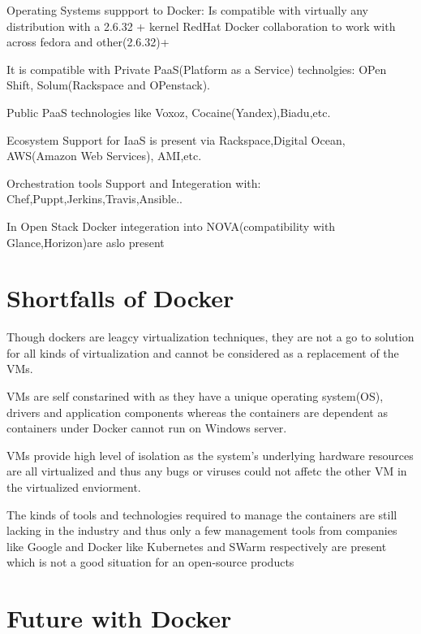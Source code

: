 \documentclass[9pt,twocolumn,twoside]{styles/osajnl}
\begin{document}
Operating Systems suppport to Docker: Is compatible with virtually
any distribution with a 2.6.32 + kernel RedHat Docker collaboration to
work with across fedora and other(2.6.32)+

It is compatible with Private PaaS(Platform as a Service) technolgies:
OPen Shift, Solum(Rackspace and OPenstack).

Public PaaS technologies like Voxoz, Cocaine(Yandex),Biadu,etc.

Ecosystem Support for IaaS is present via Rackspace,Digital Ocean,
AWS(Amazon Web Services), AMI,etc.

Orchestration tools Support and Integeration with:
Chef,Puppt,Jerkins,Travis,Ansible..

In Open Stack Docker integeration into NOVA(compatibility with
Glance,Horizon)are aslo present

\section{Shortfalls of Docker}

Though dockers are leagcy virtualization techniques, they are not a go
to solution for all kinds of virtualization and cannot be considered
as a replacement of the VMs.

VMs are self constarined with as they have a unique operating
system(OS), drivers and application components whereas the containers
are dependent as containers under Docker cannot run on Windows server.

VMs provide high level of isolation as the system's underlying
hardware resources are all virtualized and thus any bugs or viruses
could not affetc the other VM in the virtualized enviorment.

The kinds of tools and technologies required to manage the containers
are still lacking in the industry and thus only a few management tools
from companies like Google and Docker like Kubernetes and SWarm
respectively are present which is not a good situation for an
open-source products

\section{Future with Docker}
\end{document}
